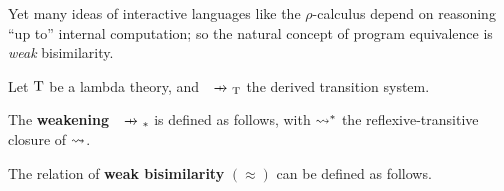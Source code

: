 \documentclass{article}
\begin{document}
Yet many ideas of interactive languages like the $\rho$-calculus depend on reasoning ``up to'' internal computation; so the natural concept of program equivalence is \textit{weak} bisimilarity.

\begin{definition}
    Let $\mathrm{T}$ be a lambda theory, and $\xr{}_\T$ the derived transition system. 
    
    The \textbf{weakening} $\xr{}_\ast$ is defined as follows, with $\rightsquigarrow^\ast$ the reflexive-transitive closure of $\rightsquigarrow$.
\end{definition}

\begin{definition}
    The relation of \textbf{weak bisimilarity} $(\approx)$ can be defined as follows.
\end{definition}





\end{document}
